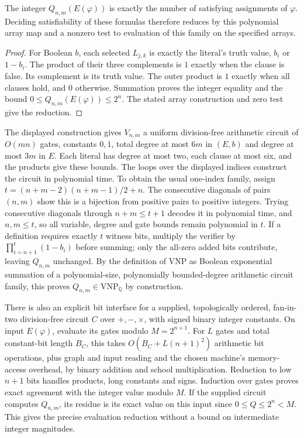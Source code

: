 \begin{proposition}\label{prop:counting}
The integer $Q_{n,m}(E(\varphi))$ is exactly the number of satisfying
assignments of $\varphi$. Deciding satisfiability of these formulas
therefore reduces by this polynomial array map and a nonzero test
to evaluation of this family on the specified arrays.
\end{proposition}
\begin{proof}
For Boolean $b$, each selected $L_{j,k}$ is exactly the literal's
truth value, $b_i$ or $1-b_i$.
The product of their three complements is $1$ exactly when the
clause is false. Its complement is its truth value.
The outer product is $1$ exactly when all clauses hold, and $0$
otherwise. Summation proves the integer equality and the bound
$0\le Q_{n,m}(E(\varphi))\le2^n$.
The stated array construction and zero test give the reduction.
\end{proof}

The displayed construction gives $V_{n,m}$ a uniform division-free
arithmetic circuit of $O(mn)$ gates, constants $0,1$, total degree
at most $6m$ in $(E,b)$ and degree at most $3m$ in $E$.
Each literal has degree at most two, each clause at most six, and
the products give these bounds. The loops over the displayed indices
construct the circuit in polynomial time. To obtain the usual one-index
family, assign
$t=(n+m-2)(n+m-1)/2+n$. The consecutive diagonals of pairs $(n,m)$
show this is a bijection from positive pairs to positive integers.
Trying consecutive diagonals through $n+m\le t+1$ decodes it in
polynomial time, and $n,m\le t$, so all variable, degree and gate bounds
remain polynomial in $t$. If a definition requires exactly $t$ witness
bits, multiply the verifier by $\prod_{i=n+1}^{t}(1-b_i)$ before
summing; only the all-zero added bits contribute, leaving $Q_{n,m}$
unchanged. By the definition of $\mathrm{VNP}$
as Boolean exponential summation of a polynomial-size,
polynomially bounded-degree arithmetic circuit family, this proves
$Q_{n,m}\in\mathrm{VNP}_{\mathbb Q}$ by construction.

There is also an explicit bit interface for a supplied, topologically
ordered, fan-in-two division-free circuit $C$ over $+,-,\times$, with
signed binary integer constants. On input $E(\varphi)$, evaluate its gates
modulo $M=2^{n+1}$. For $L$ gates and total constant-bit length $B_C$,
this takes $O(B_C+L(n+1)^2)$ arithmetic bit operations, plus graph and
input reading and the chosen machine's memory-access overhead,
by binary addition and school multiplication. Reduction to low
$n+1$ bits handles products, long constants and signs.
Induction over gates proves exact agreement with the integer value
modulo $M$. If the supplied circuit computes $Q_{n,m}$, its residue
is its exact value on this input since $0\le Q\le2^n<M$.
This gives the precise evaluation reduction without a bound on
intermediate integer magnitudes.

